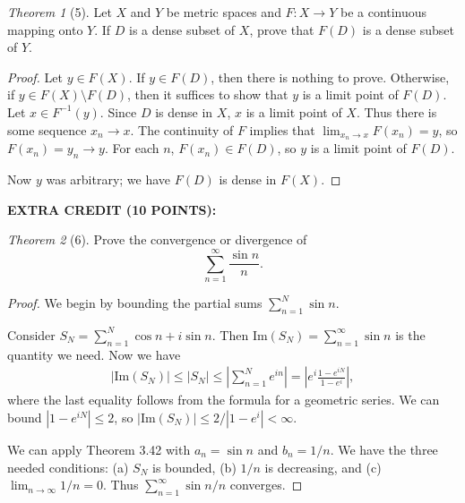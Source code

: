 \documentclass[12pt]{article}
\theoremstyle{remark}
\theoremstyle{named}
\newtheorem*{theorem}{Theorem}
\renewcommand{\Im}{\text{Im}}
\begin{document}
\begin{theorem}[5]
    Let \(X\) and \(Y\) be metric spaces and \(F : X \to Y\) be a continuous mapping onto \(Y\). If \(D\) is a dense subset of \(X\), prove that \(F(D)\) is a dense subset of \(Y\). 
\end{theorem}

\begin{proof}
    Let \(y \in F(X)\). If \(y \in F(D)\), then there is nothing to prove. Otherwise, if \(y \in F(X) \setminus F(D)\), then it suffices to show that \(y\) is a limit point of \(F(D)\). Let \(x \in F^{-1}(y)\). Since \(D\) is dense in \(X\), \(x\) is a limit point of \(X\). Thus there is some sequence \(x_n \to x\). The continuity of \(F\) implies that \(\lim_{x_n \to x} F(x_n) = y\), so \(F(x_n) = y_n \to y\). For each \(n\), \(F(x_n) \in F(D)\), so \(y\) is a limit point of \(F(D)\). 

    Now \(y\) was arbitrary; we have \(F(D)\) is dense in \(F(X)\). 
\end{proof}

\textbf{EXTRA CREDIT (10 POINTS):}

\begin{theorem}[6]
    Prove the convergence or divergence of 
    \[\sum_{n = 1}^\infty\frac{\sin n}{n}.\]
\end{theorem}

\begin{proof}
    We begin by bounding the partial sums \(\sum_{n = 1}^N \sin n\).

    Consider \(S_N = \sum_{n = 1}^N \cos n + i \sin n\). Then \(\text{Im}(S_N) = \sum_{n = 1}^\infty \sin n\) is the quantity we need. Now we have
    \begin{align*}
        |\Im(S_N)| \le |S_N| \le \left|\sum_{n = 1}^N e^{in}\right| = \left|e^i\frac{1 - e^{iN}}{1 - e^i}\right|,
    \end{align*}
    where the last equality follows from the formula for a geometric series. We can bound \(|1 - e^{iN}| \le 2\), so \(|\Im(S_N)| \le 2 / |1 - e^i| < \infty\).

    We can apply Theorem 3.42 with \(a_n = \sin n\) and \(b_n = 1/n\). We have the three needed conditions: (a) \(S_N\) is bounded, (b) \(1/n\) is decreasing, and (c) \(\lim_{n \to \infty} 1/ n = 0\). Thus \(\sum_{n = 1}^\infty \sin n / n\) converges.
\end{proof}
\end{document}
